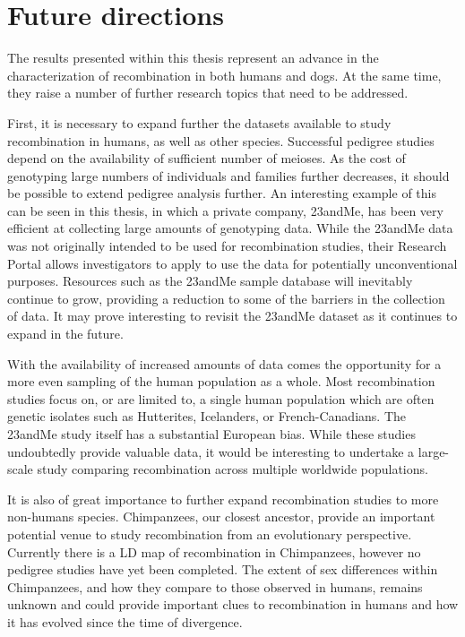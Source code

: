 \section{Future directions}

The results presented within this thesis represent an advance in the characterization of recombination in both humans and dogs.
At the same time, they raise a number of further research topics that need to be addressed.

First, it is necessary to expand further the datasets available to study recombination in humans, as well as other species.
Successful pedigree studies depend on the availability of sufficient number of meioses.
As the cost of genotyping large numbers of individuals and families further decreases, it should be possible to extend pedigree analysis further.
An interesting example of this can be seen in this thesis, in which a private company, 23andMe, has been very efficient at collecting large amounts of genotyping data.
While the 23andMe data was not originally intended to be used for recombination studies, their Research Portal\cite{23andMe2013} allows investigators to apply to use the data for potentially unconventional purposes.
Resources such as the 23andMe sample database will inevitably continue to grow, providing a reduction to some of the barriers in the collection of data.
It may prove interesting to revisit the 23andMe dataset as it continues to expand in the future.

With the availability of increased amounts of data comes the opportunity for a more even sampling of the human population as a whole.
Most recombination studies focus on, or are limited to, a single human population which are often genetic isolates such as Hutterites\cite{Coop2008}, Icelanders\cite{Kong2010}, or French-Canadians\cite{Hussin2011}.
The 23andMe study itself has a substantial European bias.
While these studies undoubtedly provide valuable data, it would be interesting to undertake a large-scale study comparing recombination across multiple worldwide populations.

It is also of great importance to further expand recombination studies to more non-humans species.
Chimpanzees, our closest ancestor, provide an important potential venue to study recombination from an evolutionary perspective.
Currently there is a LD map of recombination in Chimpanzees\cite{Auton2012a}, however no pedigree studies have yet been completed.
The extent of sex differences within Chimpanzees, and how they compare to those observed in humans, remains unknown and could provide important clues to recombination in humans and how it has evolved since the time of divergence.

